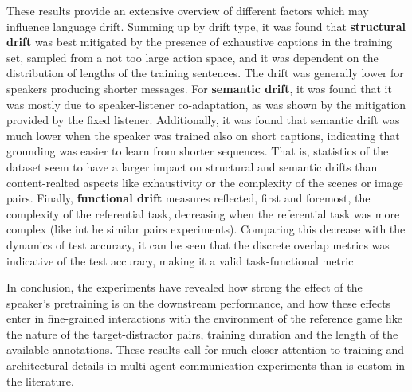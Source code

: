 These results provide an extensive overview of different factors which may influence language drift. Summing up by drift type, it was found that \textbf{structural drift} was best mitigated by the presence of exhaustive captions in the training set, sampled from a not too large action space, and it was dependent on the distribution of lengths of the training sentences. The drift was generally lower for speakers producing shorter messages. For \textbf{semantic drift}, it was found that it was mostly due to speaker-listener co-adaptation, as was shown by the mitigation provided by the fixed listener. Additionally, it was found that semantic drift was much lower when the speaker was trained also on short captions, indicating that grounding was easier to learn from shorter sequences. That is, statistics of the dataset seem to have a larger impact on structural and semantic drifts than content-realted aspects like exhaustivity or the complexity of the scenes or image pairs.  Finally, \textbf{functional drift} measures reflected, first and foremost, the complexity of the referential task, decreasing when the referential task was more complex (like int he similar pairs experiments). Comparing this decrease with the dynamics of test accuracy, it can be seen that the discrete overlap metrics was indicative of the test accuracy, making it a valid task-functional metric  

In conclusion, the experiments have revealed how strong the effect of the speaker's pretraining is on the downstream performance, and how these effects enter in fine-grained interactions with the environment of the reference game like the nature of the target-distractor pairs, training duration and the length of the available annotations. These results call for much closer attention to training and architectural details in multi-agent communication experiments than is custom in the literature.

